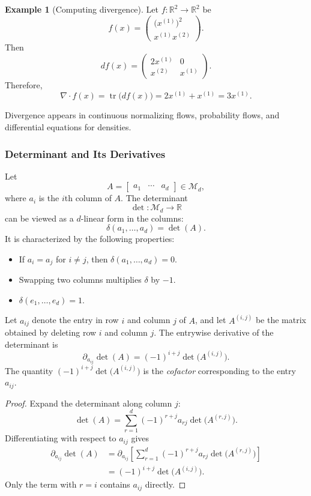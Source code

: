 \documentclass[12pt,oneside]{book}
\numberwithin{equation}{section}
\theoremstyle{definition}
\newtheorem{example}{Example}[section]
\theoremstyle{plain}
\theoremstyle{remark}
\newcommand{\R}{\mathbb{R}}
\newcommand{\tr}{\operatorname{tr}}
\begin{document}
\begin{example}[Computing divergence]
Let $f\colon\R^2\to\R^2$ be
\[
f(x)=
\begin{pmatrix}
\bigl(x^{(1)}\bigr)^2\\
x^{(1)}x^{(2)}
\end{pmatrix}.
\]
Then
\[
df(x)=
\begin{pmatrix}
2x^{(1)}&0\\
x^{(2)}&x^{(1)}
\end{pmatrix}.
\]
Therefore,
\[
\nabla\mathbin{\cdot}f(x)
=\tr\bigl(df(x)\bigr)
=2x^{(1)}+x^{(1)}
=3x^{(1)}.
\]
\end{example}

Divergence appears in continuous normalizing flows, probability flows, and differential equations for densities.

\subsubsection{Determinant and Its Derivatives}
Let
\[
A=\begin{bmatrix}a_1&\cdots&a_d\end{bmatrix}\in\mathcal{M}_d,
\]
where $a_i$ is the $i$th column of $A$. The determinant
\[
\det\colon\mathcal{M}_d\to\R
\]
can be viewed as a $d$-linear form in the columns:
\[
\delta(a_1,\ldots,a_d)=\det(A).
\]
It is characterized by the following properties:
\begin{itemize}
    \item If $a_i=a_j$ for $i\neq j$, then $\delta(a_1,\ldots,a_d)=0$.
    \item Swapping two columns multiplies $\delta$ by $-1$.
    \item $\delta(e_1,\ldots,e_d)=1$.
\end{itemize}

Let $a_{ij}$ denote the entry in row $i$ and column $j$ of $A$, and let $A^{(i,j)}$ be the matrix obtained by deleting row $i$ and column $j$. The entrywise derivative of the determinant is
\[
\partial_{a_{ij}}\det(A)
=(-1)^{i+j}\det\bigl(A^{(i,j)}\bigr).
\]
The quantity $(-1)^{i+j}\det\bigl(A^{(i,j)}\bigr)$ is the \emph{cofactor} corresponding to the entry $a_{ij}$.

\begin{proof}
Expand the determinant along column $j$:
\[
\det(A)=\sum_{r=1}^d(-1)^{r+j}a_{rj}
\det\bigl(A^{(r,j)}\bigr).
\]
Differentiating with respect to $a_{ij}$ gives
\begin{align*}
\partial_{a_{ij}}\det(A)
&=\partial_{a_{ij}}
\left[
\sum_{r=1}^d(-1)^{r+j}a_{rj}
\det\bigl(A^{(r,j)}\bigr)
\right]\\
&=(-1)^{i+j}\det\bigl(A^{(i,j)}\bigr).
\end{align*}
Only the term with $r=i$ contains $a_{ij}$ directly.
\end{proof}
\end{document}
